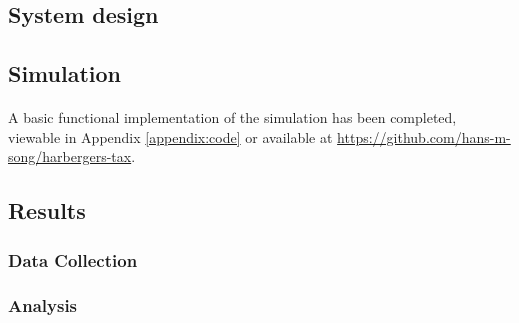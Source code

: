 \subsection{System design} %


\subsection{Simulation}

\paragraph{} A basic functional implementation of the simulation has been completed, viewable in Appendix \ref{appendix:code}  or available at \url{https://github.com/hans-m-song/harbergers-tax}. 

\begin{algorithm}
  \begin{algorithmic}[1]
     
          \EndIf
        \EndFor
      \EndFor
    \EndProcedure
  \end{algorithmic}
\end{algorithm}


\subsection{Results}

\subsubsection{Data Collection}

\subsubsection{Analysis}

